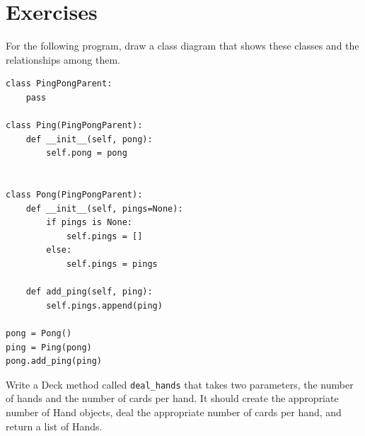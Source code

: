 \documentclass[10pt]{book}
\begin{document}
\section{Exercises}

\begin{exercise}
For the following program, draw a class diagram that shows
these classes and the relationships among them.

\begin{verbatim}
class PingPongParent:
    pass

class Ping(PingPongParent):
    def __init__(self, pong):
        self.pong = pong


class Pong(PingPongParent):
    def __init__(self, pings=None):
        if pings is None:
            self.pings = []
        else:
            self.pings = pings

    def add_ping(self, ping):
        self.pings.append(ping)

pong = Pong()
ping = Ping(pong)
pong.add_ping(ping)
\end{verbatim}


\end{exercise}



\begin{exercise}
Write a Deck method called \verb"deal_hands" that
takes two parameters, the number of hands and the number of cards per
hand.  It should create the appropriate number of Hand objects, deal
the appropriate number of cards per hand, and return a list of Hands.
\end{exercise}
\end{document}
